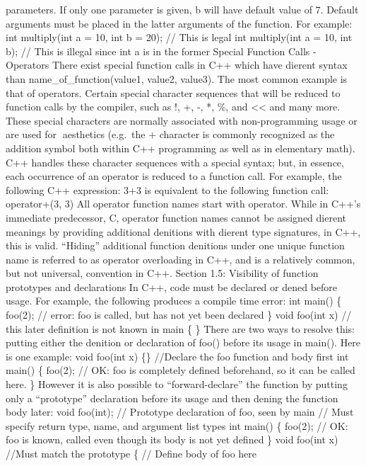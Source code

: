 parameters. If only one parameter is given, b will have default value of
7. Default arguments must be placed in the latter arguments of the
function. For example: int multiply(int a = 10, int b = 20); // This is
legal int multiply(int a = 10, int b); // This is illegal since int a is
in the former Special Function Calls - Operators There exist special
function calls in C++ which have dierent syntax than
name\_of\_function(value1, value2, value3). The most common example is
that of operators. Certain special character sequences that will be
reduced to function calls by the compiler, such as !, +, -, *, \%, and
\textless\textless{} and many more. These special characters are
normally associated with non-programming usage or are used for
aesthetics (e.g.~the + character is commonly recognized as the addition
symbol both within C++ programming as well as in elementary math). C++
handles these character sequences with a special syntax; but, in
essence, each occurrence of an operator is reduced to a function call.
For example, the following C++ expression: 3+3 is equivalent to the
following function call: operator+(3, 3) All operator function names
start with operator. While in C++'s immediate predecessor, C, operator
function names cannot be assigned dierent meanings by providing
additional denitions with dierent type signatures, in C++, this is
valid. ``Hiding'' additional function denitions under one unique
function name is referred to as operator overloading in C++, and is a
relatively common, but not universal, convention in C++. Section 1.5:
Visibility of function prototypes and declarations In C++, code must be
declared or dened before usage. For example, the following produces a
compile time error: int main() \{ foo(2); // error: foo is called, but
has not yet been declared \} void foo(int x) // this later definition is
not known in main \{ \} There are two ways to resolve this: putting
either the denition or declaration of foo() before its usage in main().
Here is one example: void foo(int x) \{\} //Declare the foo function and
body first int main() \{ foo(2); // OK: foo is completely defined
beforehand, so it can be called here. \} However it is also possible to
``forward-declare'' the function by putting only a ``prototype''
declaration before its usage and then dening the function body later:
void foo(int); // Prototype declaration of foo, seen by main // Must
specify return type, name, and argument list types int main() \{ foo(2);
// OK: foo is known, called even though its body is not yet defined \}
void foo(int x) //Must match the prototype \{ // Define body of foo here
